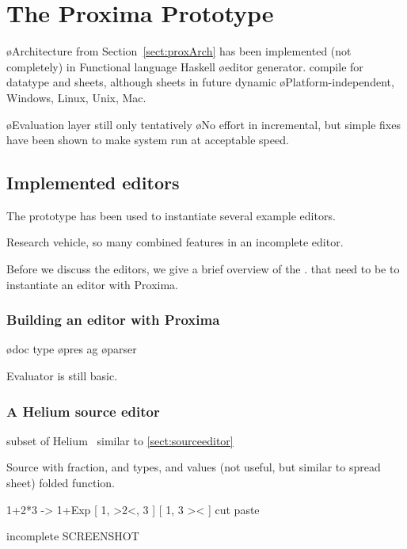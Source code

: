 \chapter{The Proxima Prototype} \label{chap:prototype}

\bl
\o Architecture from Section~\ref{sect:proxArch} has been implemented (not completely) in Functional language Haskell
\o editor generator. compile for datatype and sheets, although sheets in future dynamic
\o Platform-independent, Windows, Linux,  Unix, Mac. 
\el

\bl
\o Evaluation layer still only tentatively
\o No effort in incremental, but simple fixes have been shown to make system run at acceptable speed.
\el

\section{Implemented editors}

The prototype has been used to instantiate several example editors. 

Research vehicle, so many combined features in an incomplete editor.

Before we discuss the editors, we give a brief overview of the . that need to be to instantiate an editor with Proxima.

\subsection{Building an editor with Proxima}


\bl
\o doc type
\o pres ag
\o parser
\el

Evaluator is still basic.

\subsection{A Helium source editor}
subset of Helium~\cite{heeren03helium} similar to \ref{sect:sourceeditor}

Source with fraction, and types, and values (not useful, but similar to spread sheet)
folded function.


1+2*3     ->     1+{Exp}
[ 1, >2<, 3 ]      [ 1, 3 >< ]    
    cut                            paste

incomplete    
SCREENSHOT

